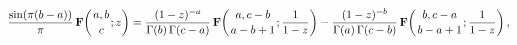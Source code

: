 \[\frac{\mathop{\sin\/}\nolimits\!\left(\pi(b-a)\right)}{\pi}\mathop{\mathbf{F}%
\/}\nolimits\!\left({a,b\atop c};z\right)=\frac{(1-z)^{-a}}{\mathop{\Gamma\/}%
\nolimits\!\left(b\right)\mathop{\Gamma\/}\nolimits\!\left(c-a\right)}\mathop{%
\mathbf{F}\/}\nolimits\!\left({a,c-b\atop a-b+1};\frac{1}{1-z}\right)-\frac{(1%
-z)^{-b}}{\mathop{\Gamma\/}\nolimits\!\left(a\right)\mathop{\Gamma\/}\nolimits%
\!\left(c-b\right)}\mathop{\mathbf{F}\/}\nolimits\!\left({b,c-a\atop b-a+1};%
\frac{1}{1-z}\right),\]